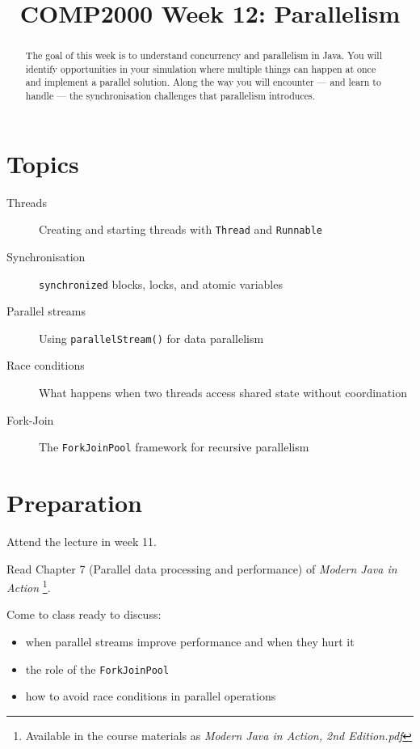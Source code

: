 \documentclass[twoside=false,DIV=14]{scrartcl}
\title{\color{redish} \vspace{-1em}COMP2000 Week 12: Parallelism}
\begin{document}
{\color{blackish}\maketitle}\vspace{-7em}

\begin{abstract}
The goal of this week is to understand concurrency and parallelism in Java.  You will identify opportunities in your simulation where multiple things can happen at once and implement a parallel solution.  Along the way you will encounter --- and learn to handle --- the synchronisation challenges that parallelism introduces.
\end{abstract}

\section*{Topics}
\begin{description}
\item[Threads] Creating and starting threads with \texttt{Thread} and \texttt{Runnable}
\item[Synchronisation] \texttt{synchronized} blocks, locks, and atomic variables
\item[Parallel streams] Using \texttt{parallelStream()} for data parallelism
\item[Race conditions] What happens when two threads access shared state without coordination
\item[Fork-Join] The \texttt{ForkJoinPool} framework for recursive parallelism
\end{description}

\section*{Preparation}
Attend the lecture in week 11.\par
Read Chapter 7 (Parallel data processing and performance) of \textit{Modern Java in Action}
\footnote{Available in the course materials as \textit{Modern Java in Action, 2nd Edition.pdf}}.

Come to class ready to discuss:
\begin{itemize}
    \item when parallel streams improve performance and when they hurt it
    \item the role of the \texttt{ForkJoinPool}
    \item how to avoid race conditions in parallel operations
\end{itemize}
\end{document}
